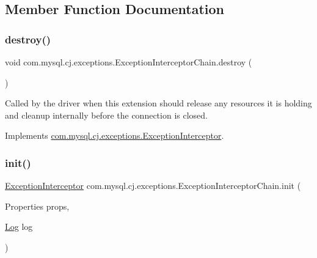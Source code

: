 \subsection{Member Function Documentation}
\mbox{\label{classcom_1_1mysql_1_1cj_1_1exceptions_1_1_exception_interceptor_chain_a23c40128c6933d51a1c29055494180db}} 
\subsubsection{\texorpdfstring{destroy()}{destroy()}}
{\footnotesize\ttfamily void com.\+mysql.\+cj.\+exceptions.\+Exception\+Interceptor\+Chain.\+destroy (\begin{DoxyParamCaption}{ }\end{DoxyParamCaption})}

Called by the driver when this extension should release any resources it is holding and cleanup internally before the connection is closed. 

Implements \mbox{\hyperlink{interfacecom_1_1mysql_1_1cj_1_1exceptions_1_1_exception_interceptor_a225145c1c4b2c7e2d20cfd0bc4e1d332}{com.\+mysql.\+cj.\+exceptions.\+Exception\+Interceptor}}.

\mbox{\label{classcom_1_1mysql_1_1cj_1_1exceptions_1_1_exception_interceptor_chain_ae29710eae9d22d426baabd3b2e589fec}} 
\subsubsection{\texorpdfstring{init()}{init()}}
{\footnotesize\ttfamily \mbox{\hyperlink{interfacecom_1_1mysql_1_1cj_1_1exceptions_1_1_exception_interceptor}{Exception\+Interceptor}} com.\+mysql.\+cj.\+exceptions.\+Exception\+Interceptor\+Chain.\+init (\begin{DoxyParamCaption}\item[{Properties}]{props,  }\item[{\mbox{\hyperlink{interfacecom_1_1mysql_1_1cj_1_1log_1_1_log}{Log}}}]{log }\end{DoxyParamCaption})}

